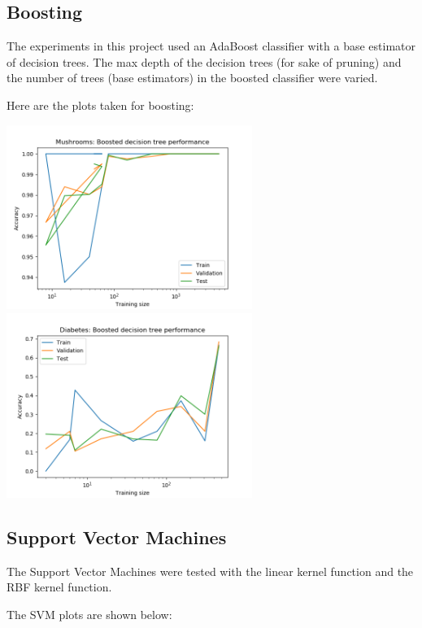 \documentclass[11pt]{article}
\begin{document}
        \subsection{Boosting}
        The experiments in this project used an AdaBoost classifier with a base estimator of decision trees.
        The max depth of the decision trees (for sake of pruning) and the number of trees (base estimators)
        in the boosted classifier were varied.

        Here are the plots taken for boosting:

        \includegraphics[width=8cm]{mushrooms/mushroom_boost_trainingsize.png}
        \includegraphics[width=8cm]{diabetes/diabetes_boost_trainingsize.png}

        \subsection{Support Vector Machines}
        The Support Vector Machines were tested with the linear kernel function and the RBF kernel function.

        The SVM plots are shown below:
\end{document}
